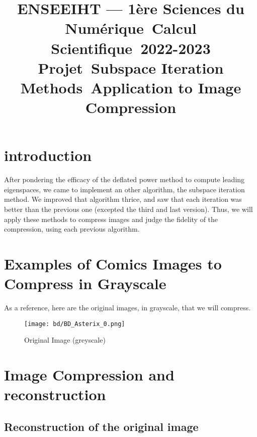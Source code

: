 \documentclass{article}
\title{ENSEEIHT — 1ère Sciences du Numérique\
Calcul Scientifique\
2022-2023 Projet\
Subspace Iteration Methods\
Application to Image Compression}
\author{}
\date{}
\begin{document}
\maketitle

\section*{introduction}

After pondering the efficacy of the deflated power method to compute leading eigenspaces, we came to implement an other algorithm, the subspace iteration method.
We improved that algorithm thrice, and saw that each iteration was better than the previous one (excepted the third and last version). Thus, we will apply these methods to compress images and judge the fidelity of the compression, using each previous algorithm.

\section{Examples of Comics Images to Compress in Grayscale}

As a reference, here are the original images, in grayscale, that we will compress.

\begin{figure}[H]
\centering
    \centering
    \texttt{[image: bd/BD\_Asterix\_0.png]}
    \caption{Original Image (greyscale)}
    \label{fig:original}
\end{figure}

\section{Image Compression and reconstruction}

\subsection{Reconstruction of the original image}
\end{document}
